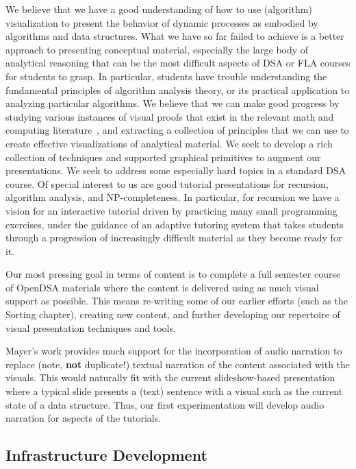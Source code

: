 \documentclass[11pt]{article}
\begin{document}
We believe that we have a good understanding of how to use (algorithm)
visualization to present the behavior of dynamic processes as embodied
by algorithms and data structures.
What we have so far failed to achieve is a better approach to
presenting conceptual material, especially the large body of
analytical reasoning that can be the most difficult aspects of DSA
or FLA courses for students to grasp.
In particular, students have trouble understanding the fundamental
principles of algorithm analysis theory, or its practical application
to analyzing particular algorithms.
We believe that we can make good progress by studying various
instances of visual proofs that exist in the relevant math and
computing
literature~\cite{Goodrich1998,Thompson2011,Blaheta2009,Sher2008,Hammack2006},
and extracting a collection of principles that we can use to create
effective visualizations of analytical material.
We seek to develop a rich collection of techniques and supported
graphical primitives to augment our presentations.
We seek to address some especially hard topics in a
standard DSA course.
Of special interest to us are good tutorial presentations for
recursion, algorithm analysis, and NP-completeness.
In particular, for recursion we have a vision for an interactive
tutorial driven by practicing many small programming exercises, under
the guidance of an adaptive tutoring system that takes students
through a progression of increasingly difficult material as they
become ready for it.

Our most pressing goal in terms of content is to complete a full
semester course of OpenDSA materials where the content is delivered
using as much visual support as possible.
This means re-writing some of our earlier efforts (such as the Sorting
chapter), creating new content, and further developing our repertoire
of visual presentation techniques and tools.

Mayer's work provides much support for
the incorporation of audio narration to replace
(note, \textbf{not} duplicate!) textual narration of the content
associated with the visuals.
This would naturally fit with the current slideshow-based presentation
where a typical slide presents a (text) sentence with a visual such as
the current state of a data structure.
Thus, our first experimentation will develop audio narration for
aspects of the tutorials.

\subsection {Infrastructure Development}
\label{plan:infrastructure}
\end{document}
